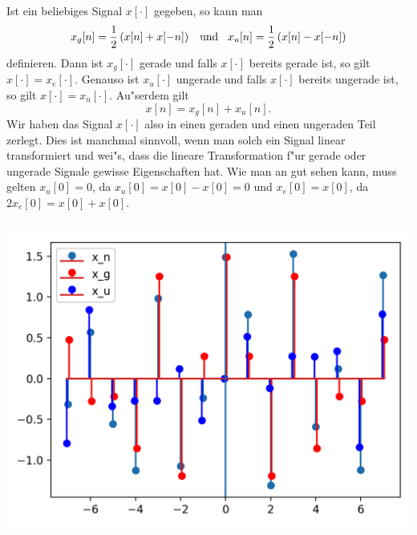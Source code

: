 Ist ein beliebiges Signal $x[\cdot]$ gegeben, so kann man
\[
    x_g[n] = \frac 12 \left(x[n] + x[-n]\right)
    {\hspace{3mm} \text{und} \hspace{3mm}}
    x_u[n] = \frac 12 \left(x[n] - x[-n]\right)
\]
definieren.
Dann ist $x_g[\cdot]$ gerade und falls $x[\cdot]$ bereits gerade ist, so gilt $x[\cdot] = x_e[\cdot]$.
Genauso ist $x_u[\cdot]$ ungerade und falls $x[\cdot]$ bereits ungerade ist, so gilt $x[\cdot] = x_u[\cdot]$.
Au"serdem gilt
\[
x[n] = x_g[n] + x_u[n].
\]
Wir haben das Signal $x[\cdot]$ also in einen geraden und einen ungeraden Teil zerlegt.
Dies ist manchmal sinnvoll, wenn man solch ein Signal linear transformiert und wei"s, dass die lineare Transformation f"ur gerade oder ungerade Signale gewisse Eigenschaften hat.
Wie man an  gut sehen kann, muss gelten $x_u[0] =0$, da $x_u[0] = x[0] - x[0] = 0$ und $x_e[0] = x[0]$, da $2 x_e[0] = x[0] + x[0]$.
%
\begin{listing}
    \noindent
    \begin{minipage}{0.49\textwidth}
        \strut\vspace*{-\baselineskip}\newline
        \inputminted[firstline=4,lastline=17]{python3}{code/even_odd.py}
    \end{minipage}%
    \begin{minipage}{0.49\textwidth}
        \strut\vspace*{-\baselineskip}\newline
        \includegraphics[width=\textwidth]{code/even_odd.png}
    \end{minipage}
    \label{py:even_odd}
\end{listing}
%
